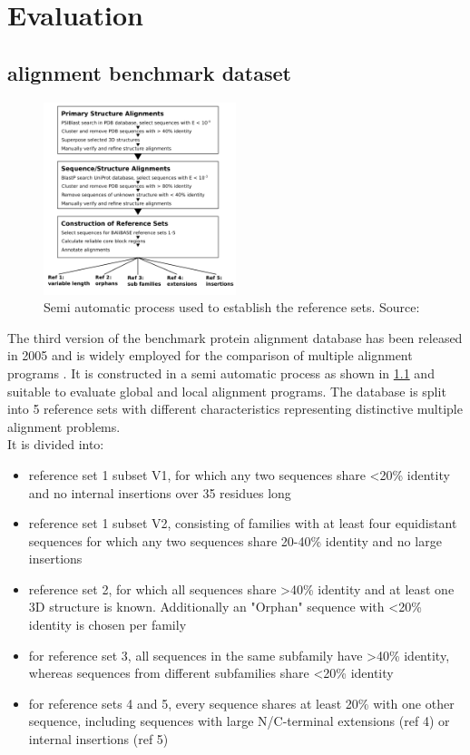 \chapter{Evaluation}

\section{ alignment benchmark dataset}
\begin{figure}
	\centering
	\includegraphics[width=0.5\textwidth]{./images/balibase.png}
	\caption{Semi automatic process used to establish the reference sets. Source: \cite{hundt2020praktkium}}
	\label{fig:balibase}
\end{figure}

The third version of the \bb benchmark protein alignment database has been released in 2005 and is widely employed for the comparison of multiple alignment programs \cite{thompson2005balibase, Russell2016}. It is constructed in a semi automatic process as shown in \cref{fig:balibase} and suitable to evaluate global and local alignment programs. The database is split into 5 reference sets with different characteristics representing distinctive multiple alignment problems. \\
It is divided into:



\begin{itemize}
	\item reference set 1 subset V1, for which any two sequences share <20\% identity and no internal insertions over 35 residues long
	\item reference set 1 subset V2, consisting of families with at least four equidistant sequences for which any two sequences share 20-40\% identity and no large insertions
	\item reference set 2, for which all sequences share >40\% identity and at least one 3D structure is known. Additionally an "Orphan" sequence with <20\% identity is chosen per family
	\item for reference set 3, all sequences in the same subfamily have >40\% identity, whereas sequences from different subfamilies share <20\% identity
	\item for reference sets 4 and 5, every sequence shares at least 20\% with one other sequence, including sequences with large N/C-terminal extensions (ref 4) or internal insertions (ref 5)
\end{itemize}

